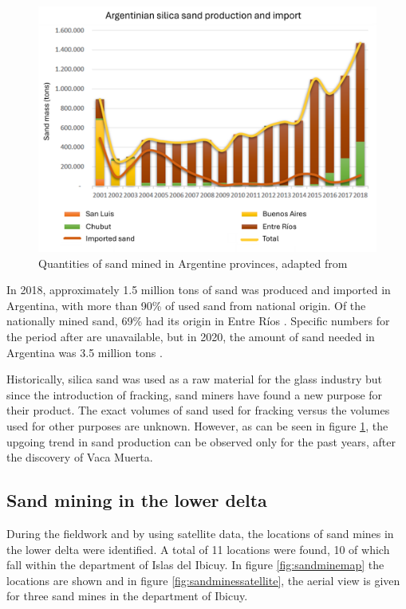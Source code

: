 \begin{figure}[H]
    \centering
    \includegraphics[width=1\linewidth]{figures/ch9/Sandgraphquantities.png}
    \caption{Quantities of sand mined in Argentine provinces, adapted from \autocite{secretariadepoliticamineraArenasParaFracking2019}}
    \label{fig:sanddiagram}
\end{figure}

In 2018, approximately 1.5 million tons of sand was produced and imported in Argentina, with more than 90\% of used sand from national origin. Of the nationally mined sand, 69\% had its origin in Entre Ríos \autocite{secretariadepoliticamineraArenasParaFracking2019}. Specific numbers for the period after are unavailable, but in 2020, the amount of sand needed in Argentina was 3.5 million tons \autocite{novasImpactoAmbientalOculto2022}.

Historically, silica sand was used as a raw material for the glass industry but since the introduction of fracking, sand miners have found a new purpose for their product. The exact volumes of sand used for fracking versus the volumes used for other purposes are unknown. However, as can be seen in figure \ref{fig:sanddiagram}, the upgoing trend in sand production can be observed only for the past years, after the discovery of Vaca Muerta.

\subsection{Sand mining in the lower delta}
During the fieldwork and by using satellite data, the locations of sand mines in the lower delta were identified. A total of 11 locations were found, 10 of which fall within the department of Islas del Ibicuy. In figure \ref{fig:sandminemap} the locations are shown and in figure \ref{fig:sandminessatellite}, the aerial view is given for three sand mines in the department of Ibicuy.

